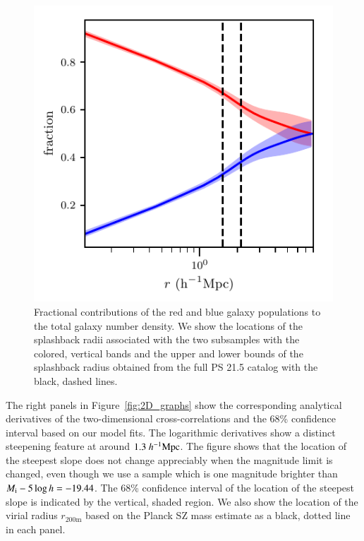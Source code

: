 \documentclass[iop, apjl, twocolappendix, numberedappendix]{emulateapj}
\def\mpch{h^{-1}{\rm Mpc}}
\begin{document}
\begin{figure}
    \includegraphics[width= \columnwidth]{color_fraction_with_spline_no_mc.pdf}
\caption{Fractional contributions of the red and blue galaxy
populations to the total galaxy number density. We show the
locations of the splashback radii associated with the two subsamples
with the colored, vertical bands and the upper and lower bounds of
the splashback radius obtained from the full PS 21.5 catalog with
the black, dashed lines.}
   \label{fig:color_fraction} 
\end{figure}
The right panels in Figure~\ref{fig:2D_graphs} show the
corresponding analytical derivatives of the two-dimensional
cross-correlations and the 68\% confidence interval based on our
model fits. The logarithmic derivatives show a distinct steepening
feature at around $1.3~\mpch$. The figure shows that the
location of the steepest slope does not change appreciably when the
magnitude limit is changed, even though we use a sample which is one
magnitude brighter than $M_{\rm i}-5\log h=-19.44$. The 68\%
confidence interval of the location of the steepest slope is
indicated by the vertical, shaded region. We also show the location
of the virial radius $r_{\mathrm{200m}}$ based on the Planck SZ mass estimate 
as a black, dotted line in each panel.
\end{document}
